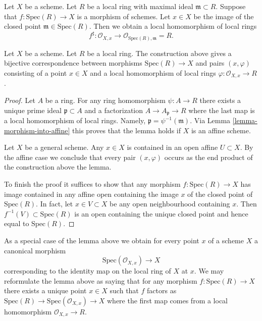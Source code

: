 \medskip\noindent
Let $X$ be a scheme. Let $R$ be a local ring with maximal ideal
$\mathfrak m \subset R$. Suppose that $f : \text{Spec}(R) \to X$
is a morphism of schemes. Let $x \in X$ be the image of the closed point
$\mathfrak m \in \text{Spec}(R)$. Then we obtain a local homomorphism
of local rings
$$
f^\sharp :
\mathcal{O}_{X, x}
\longrightarrow
\mathcal{O}_{\text{Spec}(R), \mathfrak m} = R.
$$

\begin{lemma}
\label{lemma-morphism-from-spec-local-ring}
Let $X$ be a scheme. Let $R$ be a local ring.
The construction above gives a bijective correspondence
between morphisms $\text{Spec}(R) \to X$ and pairs
$(x, \varphi)$ consisting of a point $x \in X$ and
a local homomorphism of local rings $\varphi : \mathcal{O}_{X, x} \to R$.
\end{lemma}

\begin{proof}
Let $A$ be a ring. For any ring homomorphism $\psi : A \to R$
there exists a unique prime ideal $\mathfrak p \subset A$
and a factorization $A \to A_{\mathfrak p} \to R$ where the
last map is a local homomorphism of local rings. Namely,
$\mathfrak p = \psi^{-1}(\mathfrak m)$. Via
Lemma \ref{lemma-morphism-into-affine}
this proves that the lemma holds if $X$ is an affine scheme.

\medskip\noindent
Let $X$ be a general scheme. Any $x \in X$ is contained in
an open affine $U \subset X$. By the affine case we conclude that every pair
$(x, \varphi)$ occurs as the end product of the construction
above the lemma.

\medskip\noindent
To finish the proof it suffices to show that any morphism
$f : \text{Spec}(R) \to X$ has image contained in any affine
open containing the image $x$ of the closed
point of $\text{Spec}(R)$. In fact, let $x \in V \subset X$
be any open neighbourhood containing $x$. Then
$f^{-1}(V) \subset \text{Spec}(R)$ is an open containing
the unique closed point and hence equal to $\text{Spec}(R)$.
\end{proof}

\noindent
As a special case of the lemma above we obtain for every
point $x$ of a scheme $X$ a canonical morphism
\begin{equation}
\label{equation-canonical-morphism}
\text{Spec}(\mathcal{O}_{X, x}) \longrightarrow X
\end{equation}
corresponding to the identity map on the local ring of $X$ at $x$.
We may reformulate the lemma above as saying that for any
morphism $f : \text{Spec}(R) \to X$ there exists a unique point
$x \in X$ such that $f$ factors as
$\text{Spec}(R) \to \text{Spec}(\mathcal{O}_{X, x}) \to X$
where the first map comes from a local homomorphism
$\mathcal{O}_{X, x} \to R$.

